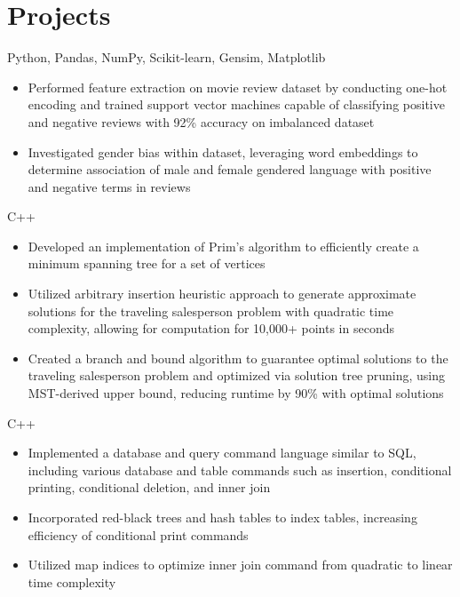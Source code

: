 \documentclass[letterpaper,11pt]{article}
\begin{document}
\section{Projects}
{Python, Pandas, NumPy, Scikit-learn, Gensim, Matplotlib}{}
\begin{itemize}[leftmargin=*]
    \item \vspace{-3pt} \small Performed feature extraction on movie review
          dataset by conducting one-hot encoding and trained support vector
          machines capable of classifying positive and negative reviews with
          92\% accuracy on imbalanced dataset
    \item \vspace{-7pt} \small Investigated gender bias within dataset,
          leveraging word embeddings to determine
          association of male and female gendered language with positive and
          negative terms in reviews
\end{itemize}
{C++}{}
\begin{itemize}[leftmargin=*]
    \item \vspace{-3pt} \small Developed an implementation of Prim's algorithm
          to efficiently create a minimum spanning tree for a set of vertices
    \item \vspace{-7pt} \small Utilized arbitrary insertion heuristic approach
          to generate approximate solutions for the traveling salesperson
          problem with quadratic time complexity,
          allowing for computation for 10,000+ points in seconds
    \item \vspace{-7pt} \small Created a branch and bound algorithm to
          guarantee optimal solutions to the traveling salesperson problem and
          optimized via solution tree pruning, using MST-derived upper bound,
          reducing runtime by 90\% with optimal solutions
\end{itemize}
{C++}{}
\begin{itemize}[leftmargin=*]
    \item \vspace{-3pt} \small Implemented a database and query command
          language similar to SQL, including various database and table commands
          such as insertion, conditional printing, conditional deletion, and
          inner join
    \item \vspace{-7pt} \small Incorporated red-black trees and hash tables
          to index tables, increasing efficiency of conditional print commands
    \item \vspace{-7pt} \small Utilized map indices to optimize inner join
          command from quadratic to linear time complexity
\end{itemize}
\end{document}
